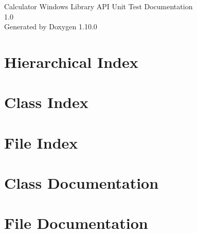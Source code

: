 \documentclass[twoside]{book}
\newcommand{\+}{\discretionary{\mbox{\scriptsize$\hookleftarrow$}}{}{}}
\newcommand{\clearemptydoublepage}{%
    \newpage{\pagestyle{empty}\cleardoublepage}%
  }
\begin{document}
  \raggedbottom
    \hypersetup{pageanchor=false,
                bookmarksnumbered=true,
                pdfencoding=unicode
               }
  \begin{titlepage}
  \vspace*{7cm}
  \begin{center}%
  {\Large Calculator Windows  Library API Unit Test Documentation}\\
  [1ex]\large 1.\+0 \\
  \vspace*{1cm}
  {\large Generated by Doxygen 1.10.0}\\
  \end{center}
  \end{titlepage}
  \clearemptydoublepage
  \tableofcontents
  \clearemptydoublepage
  \hypersetup{pageanchor=true}

\chapter{Hierarchical Index}

\chapter{Class Index}

\chapter{File Index}

\chapter{Class Documentation}



\chapter{File Documentation}







  \backmatter
  \newpage
  \clearemptydoublepage
  \printindex
\end{document}
